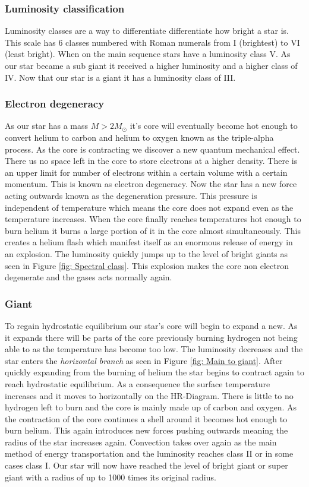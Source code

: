 \documentclass[reprint,english,notitlepage]{revtex4-2}
\begin{document}
\subsubsection*{Luminosity classification}
Luminosity classes are a way to differentiate differentiate how bright a star is. This scale has 6 classes numbered with Roman numerals from I (brightest) to VI (least bright). When on the main sequence stars have a luminosity class V. As our star became a sub giant it received a higher luminosity and a higher class of IV. Now that our star is a giant it has a luminosity class of III.   


\subsubsection*{Electron degeneracy}
As our star has a mass $ M > 2M_{⊙} $ it's core will eventually become hot enough to convert helium to carbon and helium to oxygen known as the triple-alpha process. As the core is contracting we discover a new quantum mechanical effect. There us no space left in the core to store electrons at a higher density. There is an upper limit for number of electrons within a certain volume with a certain momentum. This is known as electron degeneracy. Now the star has a new force acting outwards known as the degeneration pressure. This pressure is independent of temperature  which means the core does not expand even as the temperature increases. When the core finally reaches temperatures hot enough to burn helium it burns a large portion of it in the core almost simultaneously. This creates a helium flash which manifest itself as an enormous release of energy in an explosion. The luminosity quickly jumps up to the level of bright giants as seen in Figure \ref{fig: Spectral class}. This explosion makes the core non electron degenerate and the gases acts normally again. 


\subsubsection*{Giant}  
To regain hydrostatic equilibrium our star's core will begin to expand a new. As it expands there will be parts of the core previously burning hydrogen not being able to as the temperature has become too low. The luminosity decreases and the star enters the \textit{horizontal branch} as seen in Figure \ref{fig: Main to giant}. After quickly expanding from the burning of helium the star begins to contract again to reach hydrostatic equilibrium. As a consequence the surface temperature increases and it moves to horizontally on the HR-Diagram. There is little to no hydrogen left to burn and the core is mainly made up of carbon and oxygen. As the contraction of the core continues a shell around it becomes hot enough to burn helium. This again introduces new forces pushing outwards meaning the radius of the star increases again. Convection takes over again as the main method of energy transportation and the luminosity reaches class II or in some cases class I. Our star will now have reached the level of bright giant or super giant with a radius of up to 1000 times its original radius. 
\end{document}
